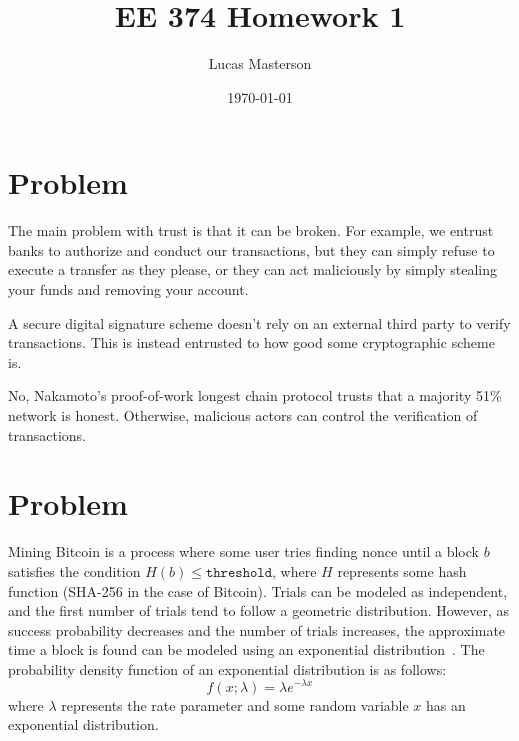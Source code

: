 \documentclass[11pt]{article}
\title{EE 374 Homework 1}
\author{Lucas Masterson}
\date{\today}
\begin{document}
\maketitle


\renewcommand{\thep}{\thesection.\alph{p}}


\section{Problem}

\begin{p} \end{p}
The main problem with trust is that it can be broken. For example, we entrust banks to authorize and conduct our transactions, but they can simply refuse to execute a transfer as they please, or they can act maliciously by simply stealing your funds and removing your account.

\begin{p}\end{p}
A secure digital signature scheme doesn't rely on an external third party to verify transactions. This is instead entrusted to how good some cryptographic scheme is.

\begin{p}\end{p}
No, Nakamoto's proof-of-work longest chain protocol trusts that a majority 51\% network is honest. Otherwise, malicious actors can control the verification of transactions.

\section{Problem}

\begin{p}\end{p}
Mining Bitcoin is a process where some user tries finding nonce until a block $b$ satisfies the condition $H(b) \leq \texttt{threshold}$, where $H$ represents some hash function (SHA-256 in the case of Bitcoin). Trials can be modeled as independent, and the first number of trials tend to follow a geometric distribution. However, as success probability decreases and the number of trials increases, the approximate time a block is found can be modeled using an exponential distribution~\citep{wikipediaExponentialDistribution}. The probability density function of an exponential distribution is as follows:
\begin{equation}
    f(x; \lambda) = \lambda e^{-\lambda x}
\end{equation}
where $\lambda$ represents the rate parameter and some random variable $x$ has an exponential distribution.
\end{document}
